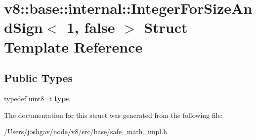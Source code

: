 \hypertarget{structv8_1_1base_1_1internal_1_1_integer_for_size_and_sign_3_011_00_01false_01_4}{}\section{v8\+:\+:base\+:\+:internal\+:\+:Integer\+For\+Size\+And\+Sign$<$ 1, false $>$ Struct Template Reference}
\label{structv8_1_1base_1_1internal_1_1_integer_for_size_and_sign_3_011_00_01false_01_4}
\subsection*{Public Types}
\begin{DoxyCompactItemize}
\item 
typedef uint8\+\_\+t {\bfseries type}\hypertarget{structv8_1_1base_1_1internal_1_1_integer_for_size_and_sign_3_011_00_01false_01_4_a71995ca31dfbedfb1ea5933f8713e9ef}{}\label{structv8_1_1base_1_1internal_1_1_integer_for_size_and_sign_3_011_00_01false_01_4_a71995ca31dfbedfb1ea5933f8713e9ef}

\end{DoxyCompactItemize}


The documentation for this struct was generated from the following file\+:\begin{DoxyCompactItemize}
\item 
/\+Users/joshgav/node/v8/src/base/safe\+\_\+math\+\_\+impl.\+h\end{DoxyCompactItemize}
